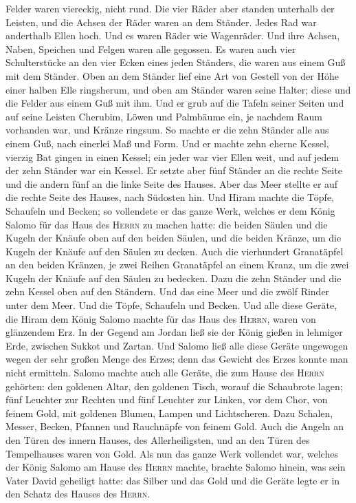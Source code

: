 Felder waren viereckig, nicht rund.  Die vier Räder aber
standen unterhalb der Leisten, und die Achsen der Räder waren an dem
Ständer. Jedes Rad war anderthalb Ellen hoch.  Und es
waren Räder wie Wagenräder. Und ihre Achsen, Naben, Speichen und Felgen
waren alle gegossen.  Es waren auch vier Schulterstücke
an den vier Ecken eines jeden Ständers, die waren aus einem Guß mit dem
Ständer.  Oben an dem Ständer lief eine Art von Gestell
von der Höhe einer halben Elle ringsherum, und oben am Ständer waren
seine Halter; diese und die Felder aus einem Guß mit ihm.
 Und er grub auf die Tafeln seiner Seiten und auf seine
Leisten Cherubim, Löwen und Palmbäume ein, je nachdem Raum vorhanden
war, und Kränze ringsum.  So machte er die zehn Ständer
alle aus einem Guß, nach einerlei Maß und Form.  Und er
machte zehn eherne Kessel, vierzig Bat gingen in einen Kessel; ein jeder
war vier Ellen weit, und auf jedem der zehn Ständer war ein Kessel.
 Er setzte aber fünf Ständer an die rechte Seite und die
andern fünf an die linke Seite des Hauses. Aber das Meer stellte er auf
die rechte Seite des Hauses, nach Südosten hin.  Und
Hiram machte die Töpfe, Schaufeln und Becken; so vollendete er das ganze
Werk, welches er dem König Salomo für das Haus des \textsc{Herrn} zu
machen hatte:  die beiden Säulen und die Kugeln der
Knäufe oben auf den beiden Säulen, und die beiden Kränze, um die Kugeln
der Knäufe auf den Säulen zu decken.  Auch die
vierhundert Granatäpfel an den beiden Kränzen, je zwei Reihen
Granatäpfel an einem Kranz, um die zwei Kugeln der Knäufe auf den Säulen
zu bedecken.  Dazu die zehn Ständer und die zehn Kessel
oben auf den Ständern.  Und das eine Meer und die zwölf
Rinder unter dem Meer.  Und die Töpfe, Schaufeln und
Becken. Und alle diese Geräte, die Hiram dem König Salomo machte für das
Haus des \textsc{Herrn}, waren von glänzendem Erz.  In
der Gegend am Jordan ließ sie der König gießen in lehmiger Erde,
zwischen Sukkot und Zartan.  Und Salomo ließ alle diese
Geräte ungewogen wegen der sehr großen Menge des Erzes; denn das Gewicht
des Erzes konnte man nicht ermitteln.  Salomo machte auch
alle Geräte, die zum Hause des \textsc{Herrn} gehörten: den goldenen
Altar, den goldenen Tisch, worauf die Schaubrote lagen; 
fünf Leuchter zur Rechten und fünf Leuchter zur Linken, vor dem Chor,
von feinem Gold, mit goldenen Blumen, Lampen und Lichtscheren.
 Dazu Schalen, Messer, Becken, Pfannen und Rauchnäpfe von
feinem Gold. Auch die Angeln an den Türen des innern Hauses, des
Allerheiligsten, und an den Türen des Tempelhauses waren von Gold.
 Als nun das ganze Werk vollendet war, welches der König
Salomo am Hause des \textsc{Herrn} machte, brachte Salomo hinein, was
sein Vater David geheiligt hatte: das Silber und das Gold und die Geräte
legte er in den Schatz des Hauses des \textsc{Herrn}.

